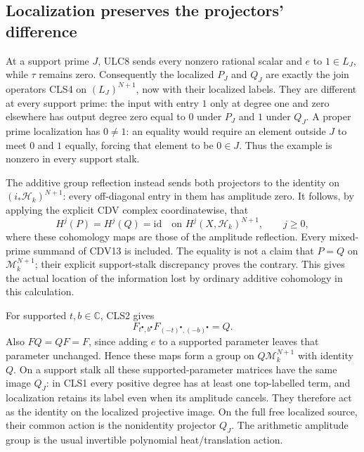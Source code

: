 \documentclass[11pt,a4paper]{article}
\theoremstyle{definition}\newtheorem{definition}[theorem]{Definition}
\begin{document}
\subsection{Localization preserves the projectors' difference}
At a support prime $J$, ULC8 sends every nonzero rational scalar
and $e$ to $1\in L_J$, while $\tau$ remains zero. Consequently
the localized $P_J$ and $Q_J$ are exactly the join operators CLS4
on $(L_J)^{N+1}$, now with their localized labels. They are
different at every support prime: the input with entry $1$ only
at degree one and zero elsewhere has output degree zero equal
to $0$ under $P_J$ and $1$ under $Q_J$. A proper prime localization
has $0\ne1$: an equality would require an element outside $J$
to meet $0$ and $1$ equally, forcing that element to be $0\in J$.
Thus the example is nonzero in every support stalk.

The additive group reflection instead sends both projectors to
the identity on $(i_*\mathcal H_k)^{N+1}$: every off-diagonal
entry in them has amplitude zero. It follows, by applying the
explicit CDV complex coordinatewise, that
\begin{equation}\tag{CLS5}
 H^j(P)=H^j(Q)=\mathrm{id}\quad\text{on }
 H^j(X,\mathcal H_k)^{N+1},\qquad j\ge0,
\end{equation}
where these cohomology maps are those of the amplitude reflection.
Every mixed-prime summand of CDV13 is included. The equality is
not a claim that $P=Q$ on $\mathcal M_k^{N+1}$; their explicit
support-stalk discrepancy proves the contrary. This gives the
actual location of the information lost by ordinary additive
cohomology in this calculation.

For supported $t,b\in\mathbb C$, CLS2 gives
\begin{equation}\tag{CLS6}
 F_{t^\bullet,b^\bullet}F_{(-t)^\bullet,(-b)^\bullet}=Q.
\end{equation}
Also $FQ=QF=F$, since adding $e$ to a supported parameter leaves
that parameter unchanged. Hence these maps form a group on
$Q\mathcal M_k^{N+1}$ with identity $Q$. On a support stalk all
these supported-parameter matrices have the same image $Q_J$:
in CLS1 every positive degree has at least one top-labelled term,
and localization retains its label even when its amplitude cancels.
They therefore act as the identity on the localized projective image.
On the full free localized source, their common action is the
nonidentity projector $Q_J$. The arithmetic amplitude group is the
usual invertible polynomial heat/translation action.
\end{document}
